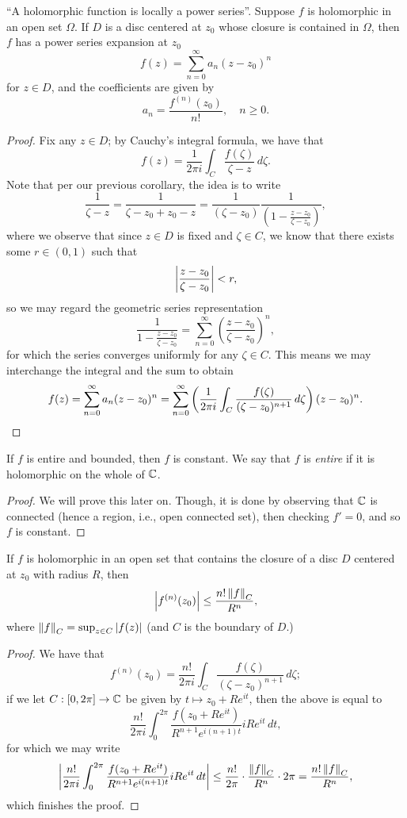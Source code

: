 \begin{theorem}
    ``A holomorphic function is locally a power series''. Suppose $f$ is holomorphic in an open set $\Omega$. If $D$ is a disc centered at $z_0$ whose closure is contained in $\Omega$, then $f$ has a power series expansion at $z_0$
    \[ f(z) = \sum_{n = 0}^\infty a_n (z - z_0)^n \]
    for $z \in D$, and the coefficients are given by
    \[ a_n = \frac{f^{(n)}(z_0)}{n!}, \quad n \geq 0. \]
\end{theorem}
\begin{proof}
    Fix any $z \in D$; by Cauchy's integral formula, we have that
    \[ f(z) = \frac{1}{2\pi i} \int_C \frac{f(\zeta)}{\zeta - z} \, d\zeta. \]
    Note that per our previous corollary, the idea is to write
    \[ \frac{1}{\zeta - z} = \frac{1}{\zeta - z_0 + z_0 - z} = \frac{1}{(\zeta - z_0)}\frac{1}{\left(1 - \frac{z - z_0}{\zeta - z_0}\right)}, \]
    where we observe that since $z \in D$ is fixed and $\zeta \in C$, we know that there exists some $r \in (0, 1)$ such that
    \[ \left\lvert \frac{z - z_0}{\zeta - z_0} \right\rvert < r, \]
    so we may regard the geometric series representation
    \[ \frac{1}{1 - \frac{z - z_0}{\zeta - z_0}} = \sum_{n=0}^\infty \left(\frac{z - z_0}{\zeta - z_0}\right)^n, \]
    for which the series converges uniformly for any $\zeta \in C$. This means we may interchange the integral and the sum to obtain
    \[ f(z) = \sum_{n=0}^\infty a_n (z - z_0)^n = \sum_{n=0}^\infty \left(\frac{1}{2 \pi i} \int_C \frac{f(\zeta)}{(\zeta - z_0)^{n+1}} \, d\zeta\right) (z - z_0)^n. \qedhere \]
\end{proof}
\begin{corollary}
    If $f$ is entire and bounded, then $f$ is constant. We say that $f$ is \textit{entire} if it is holomorphic on the whole of $\mathbb C$.
\end{corollary}
\begin{proof}
    We will prove this later on. Though, it is done by observing that $\mathbb C$ is connected (hence a region, i.e., open connected set), then checking $f' = 0$, and so $f$ is constant.
\end{proof}
\begin{corollary}
    If $f$ is holomorphic in an open set that contains the closure of a disc $D$ centered at $z_0$ with radius $R$, then
    \[ \left\lvert f^{(n)}(z_0) \right\rvert \leq \frac{n! \left\lVert f \right\rVert_C}{R^n}, \]
    where $\left\lVert f \right\rVert_C = \sup_{z \in C} \left\lvert f(z) \right\rvert$ (and $C$ is the boundary of $D$.)
\end{corollary}
\begin{proof}
    We have that
    \[ f^{(n)}(z_0) = \frac{n!}{2\pi i} \int_C \frac{f(\zeta)}{(\zeta - z_0)^{n+1}} \, d\zeta; \]
    if we let $C : [0, 2\pi] \to \mathbb C$ be given by $t \mapsto z_0 + Re^{it}$, then the above is equal to
    \[ \frac{n!}{2 \pi i} \int_0^{2\pi} \frac{f(z_0 + Re^{it})}{R^{n+1} e^{i(n+1)t}} i Re^{it} \, dt, \]
    for which we may write
    \[ \left\lvert \frac{n!}{2 \pi i} \int_0^{2\pi} \frac{f(z_0 + Re^{it})}{R^{n+1} e^{i(n+1)t}} i Re^{it} \, dt \right\rvert \leq \frac{n!}{2\pi} \cdot \frac{\left\lVert f \right\rVert_C}{R^n} \cdot 2\pi = \frac{n! \left\lVert f \right\rVert_C}{R^n}, \]
    which finishes the proof.
\end{proof}
